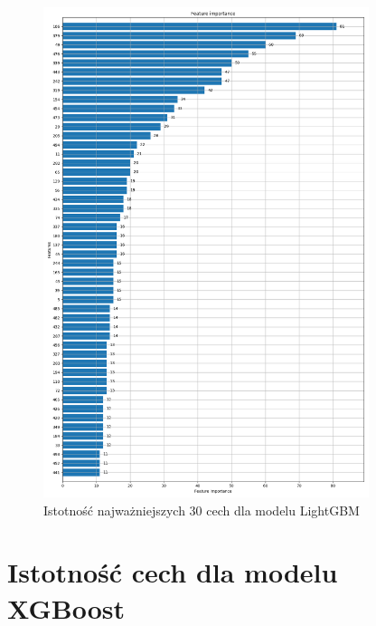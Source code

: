 \documentclass[a4paper,12pt]{article}
\begin{document}
\begin{appendices}
        \begin{figure}[!h]
            \centering
            \includegraphics[width=0.85\textwidth]{../images/lightgbm-feature-importance.png}
            \caption{Istotność najważniejszych 30 cech dla modelu LightGBM}
            \label{fig:feature-importance-lightgbm}
        \end{figure}

        \section{Istotność cech dla modelu XGBoost}\label{appendix:feature-importance-xgboost}


\end{appendices}
\end{document}
